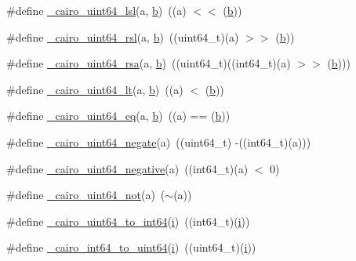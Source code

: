 \begin{DoxyCompactItemize}
\item 
\#define \hyperlink{cairo-wideint-private_8h_a62c4fbc7bcfe019fb0eb8d01a58c3c2b}{\+\_\+cairo\+\_\+uint64\+\_\+lsl}(a,  \hyperlink{lte__pathloss_8m_a21ad0bd836b90d08f4cf640b4c298e7c}{b})~((a) $<$$<$ (\hyperlink{lte__pathloss_8m_a21ad0bd836b90d08f4cf640b4c298e7c}{b}))
\item 
\#define \hyperlink{cairo-wideint-private_8h_ac761ff4bb96d25c934013195a746a09b}{\+\_\+cairo\+\_\+uint64\+\_\+rsl}(a,  \hyperlink{lte__pathloss_8m_a21ad0bd836b90d08f4cf640b4c298e7c}{b})~((uint64\+\_\+t)(a) $>$$>$ (\hyperlink{lte__pathloss_8m_a21ad0bd836b90d08f4cf640b4c298e7c}{b}))
\item 
\#define \hyperlink{cairo-wideint-private_8h_ab6266c74d1911d420024452271154979}{\+\_\+cairo\+\_\+uint64\+\_\+rsa}(a,  \hyperlink{lte__pathloss_8m_a21ad0bd836b90d08f4cf640b4c298e7c}{b})~((uint64\+\_\+t)((int64\+\_\+t)(a) $>$$>$ (\hyperlink{lte__pathloss_8m_a21ad0bd836b90d08f4cf640b4c298e7c}{b})))
\item 
\#define \hyperlink{cairo-wideint-private_8h_a2cc85e3ec519a71b4c52f6e43affdace}{\+\_\+cairo\+\_\+uint64\+\_\+lt}(a,  \hyperlink{lte__pathloss_8m_a21ad0bd836b90d08f4cf640b4c298e7c}{b})~((a) $<$ (\hyperlink{lte__pathloss_8m_a21ad0bd836b90d08f4cf640b4c298e7c}{b}))
\item 
\#define \hyperlink{cairo-wideint-private_8h_a11f7497972865b56035af1e3c3ae734d}{\+\_\+cairo\+\_\+uint64\+\_\+eq}(a,  \hyperlink{lte__pathloss_8m_a21ad0bd836b90d08f4cf640b4c298e7c}{b})~((a) == (\hyperlink{lte__pathloss_8m_a21ad0bd836b90d08f4cf640b4c298e7c}{b}))
\item 
\#define \hyperlink{cairo-wideint-private_8h_a299c92ec745442ee23f8343d543a453b}{\+\_\+cairo\+\_\+uint64\+\_\+negate}(a)~((uint64\+\_\+t) -\/((int64\+\_\+t)(a)))
\item 
\#define \hyperlink{cairo-wideint-private_8h_ae93c78397b1830f413141df1f4f1abbf}{\+\_\+cairo\+\_\+uint64\+\_\+negative}(a)~((int64\+\_\+t)(a) $<$ 0)
\item 
\#define \hyperlink{cairo-wideint-private_8h_ae5625d3733eb3a49b1fff9ca0721e1e8}{\+\_\+cairo\+\_\+uint64\+\_\+not}(a)~($\sim$(a))
\item 
\#define \hyperlink{cairo-wideint-private_8h_afd6905afac6e971cfeb4bb8b4231cca5}{\+\_\+cairo\+\_\+uint64\+\_\+to\+\_\+int64}(\hyperlink{lte__uplink__power__control_8m_a6f6ccfcf58b31cb6412107d9d5281426}{i})~((int64\+\_\+t)(\hyperlink{lte__uplink__power__control_8m_a6f6ccfcf58b31cb6412107d9d5281426}{i}))
\item 
\#define \hyperlink{cairo-wideint-private_8h_a82fed22e7f27e79533f943bf03ccd321}{\+\_\+cairo\+\_\+int64\+\_\+to\+\_\+uint64}(\hyperlink{lte__uplink__power__control_8m_a6f6ccfcf58b31cb6412107d9d5281426}{i})~((uint64\+\_\+t)(\hyperlink{lte__uplink__power__control_8m_a6f6ccfcf58b31cb6412107d9d5281426}{i}))
$$
\end{DoxyCompactItemize}

